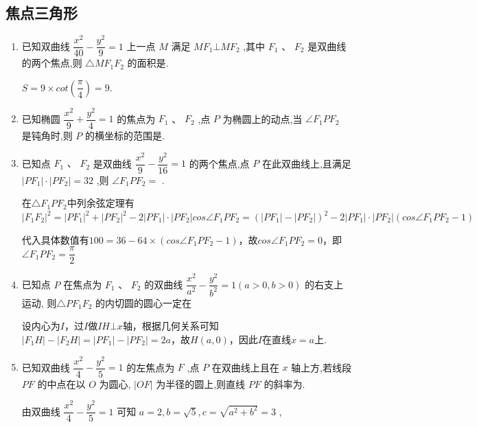 \subsection*{焦点三角形}
\begin{enumerate}
    \item 已知双曲线 $\dfrac{{x}^{2}}{40} - \dfrac{{y}^{2}}{9} = 1$ 上一点 $M$ 满足 $M{F}_{1} \bot  M{F}_{2}$ ,其中 ${F}_{1}\text{ 、 }{F}_{2}$ 是双曲线的两个焦点,则 $\bigtriangleup  M{F}_{1}{F}_{2}$ 的面积是.
    \begin{jieda}
        $S = 9 \times cot\left(\dfrac{\pi}{4}\right) = 9$.
    \end{jieda}
    \item 已知椭圆 $\dfrac{{x}^{2}}{9} + \dfrac{{y}^{2}}{4} = 1$ 的焦点为 ${F}_{1}$ 、 ${F}_{2}$ ,点 $P$ 为椭圆上的动点,当 $\angle {F}_{1}P{F}_{2}$ 是钝角时,则 $P$ 的横坐标的范围是.
    \item 已知点 ${F}_{1}\text{ 、 }{F}_{2}$ 是双曲线 $\dfrac{{x}^{2}}{9} - \dfrac{{y}^{2}}{16} = 1$ 的两个焦点,点 $P$ 在此双曲线上,且满足 $\left| {P{F}_{1}}\right|  \cdot  \left| {P{F}_{2}}\right|  = {32}$ ,则 $\angle {F}_{1}P{F}_{2} =$ .
    \begin{jieda}
        在$\triangle F_1PF_2$中列余弦定理有$|F_1F_2|^2 = |PF_1|^2+|PF_2|^2 - 2|PF_1|\cdot |PF_2| cos\angle {F}_{1}P{F}_{2} = \left(|PF_1|-|PF_2|\right)^2-2|PF_1|\cdot |PF_2| (cos\angle {F}_{1}P{F}_{2} - 1)$

        代入具体数值有$100 = 36 - 64 \times (cos\angle {F}_{1}P{F}_{2} - 1)$，故$cos\angle {F}_{1}P{F}_{2} = 0$，即$\angle {F}_{1}P{F}_{2} = \dfrac{\pi}{2}$
    \end{jieda}
    
    \item 已知点 $P$ 在焦点为 ${F}_{1}$ 、 ${F}_{2}$ 的双曲线 $\dfrac{{x}^{2}}{{a}^{2}} - \dfrac{{y}^{2}}{{b}^{2}} = 1\left( {a > 0,b > 0}\right)$ 的右支上运动, 则$\triangle P{F}_{1}{F}_{2}$ 的内切圆的圆心一定在
    \begin{jieda}
        设内心为$I$，过$I$做$IH \bot x$轴，根据几何关系可知$|F_1H| - |F_2H| = |PF_1| - |PF_2| = 2a$，故$H(a, 0)$，因此$I$在直线$x = a$上.
    \end{jieda}
    
    \item 已知双曲线 $\dfrac{{x}^{2}}{4} - \dfrac{{y}^{2}}{5} = 1$ 的左焦点为 $F$ ,点 $P$ 在双曲线上且在 $x$ 轴上方,若线段 ${PF}$ 的中点在以 $O$ 为圆心, $\left| {OF}\right|$ 为半径的圆上,则直线 ${PF}$ 的斜率为.
    \begin{jieda}
        由双曲线 $\dfrac{{x}^{2}}{4} - \dfrac{{y}^{2}}{5} = 1$ 可知 $a = 2,b = \sqrt{5},c = \sqrt{{a}^{2} + {b}^{2}} = 3$ ,
        

\end{jieda}
\end{enumerate}
